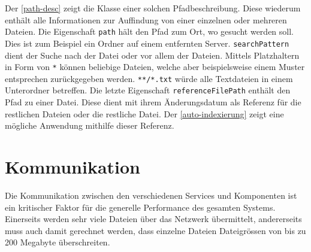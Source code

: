 
Der \autoref{path-desc} zeigt die Klasse einer solchen Pfadbeschreibung. Diese wiederum enthält alle Informationen zur Auffindung von einer einzelnen oder mehreren Dateien. Die Eigenschaft \texttt{path} hält den Pfad zum Ort, wo gesucht werden soll. Dies ist zum Beispiel ein Ordner auf einem entfernten Server. \texttt{searchPattern} dient der Suche nach der Datei oder vor allem der Dateien. Mittels Platzhaltern in Form von \texttt{*} können beliebige Dateien, welche aber beispielsweise einem Muster entsprechen zurückgegeben werden. \verb|**/*.txt| würde alle Textdateien in einem Unterordner betreffen. Die letzte Eigenschaft \texttt{referenceFilePath} enthält den Pfad zu einer Datei. Diese dient mit ihrem Änderungsdatum als Referenz für die restlichen Dateien oder die restliche Datei. Der \autoref{auto-indexierung} zeigt eine mögliche Anwendung mithilfe dieser Referenz.





\section{Kommunikation}


Die Kommunikation zwischen den verschiedenen Services und Komponenten ist ein kritischer Faktor für die generelle Performance des gesamten Systems. Einerseits werden sehr viele Dateien über das Netz\-we\-rk übermittelt, andererseits muss auch damit ge\-rech\-net werden, dass einzelne Dateien Dateigrössen von bis zu 200 Megabyte überschreiten.


